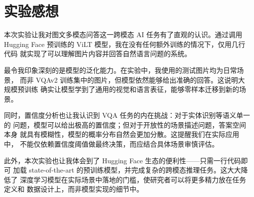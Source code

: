 \documentclass[UTF8,a4paper,12pt,fontset=none]{ctexart}
\begin{document}
\section{实验感想}

本次实验让我对图文多模态问答这一跨模态 AI 任务有了直观的认识。通过调用
Hugging Face 预训练的 ViLT 模型，我在没有任何额外训练的情况下，仅用几行代码
就实现了可以理解图片内容并回答自然语言问题的系统。

最令我印象深刻的是模型的泛化能力。在实验中，我使用的测试图片均为日常场景，
而非 VQAv2 训练集中的图片，但模型依然能够给出准确的回答。这说明大规模预训练
确实让模型学到了通用的视觉和语言表征，能够零样本迁移到新的场景。

同时，置信度分析也让我认识到 VQA 任务的内在挑战：对于实体识别等语义单一的
问题，模型可以给出极高的置信度；但对于开放性的场景描述问题，答案空间本身
就具有模糊性，模型的概率分布自然会更加分散。这提醒我们在实际应用中，
不能仅依赖置信度阈值做最终决策，而应结合具体场景审慎评估。

此外，本次实验也让我体会到了 Hugging Face 生态的便利性——只需一行代码即可
加载 state-of-the-art 的预训练模型，并完成复杂的跨模态推理任务。这大大降低了
深度学习模型在实际场景中落地的门槛，使研究者可以将更多精力放在任务定义和
数据设计上，而非模型实现的细节中。
\end{document}
